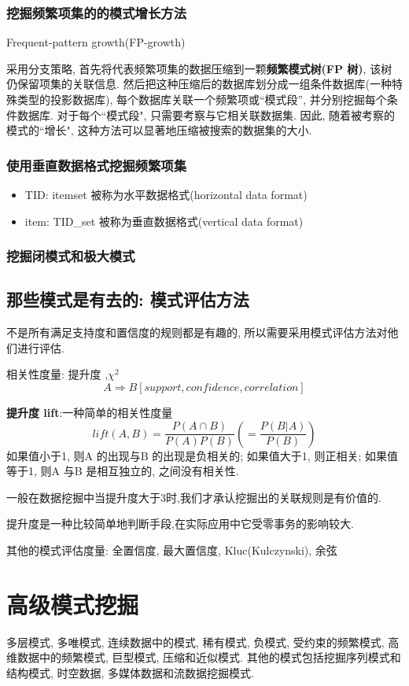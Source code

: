 \documentclass{article}
\begin{document}
\subsubsection{挖掘频繁项集的的模式增长方法}
Frequent-pattern growth(FP-growth)

采用分支策略, 首先将代表频繁项集的数据压缩到一颗\textbf{频繁模式树(FP 树)}, 该树仍保留项集的关联信息. 然后把这种压缩后的数据库划分成一组条件数据库(一种特殊类型的投影数据库), 每个数据库关联一个频繁项或``模式段'', 并分别挖掘每个条件数据库. 对于每个``模式段", 只需要考察与它相关联数据集. 因此, 随着被考察的模式的``增长", 这种方法可以显著地压缩被搜索的数据集的大小.

\subsubsection{使用垂直数据格式挖掘频繁项集}
\begin{itemize}
	\item TID: itemset 被称为水平数据格式(horizontal data format)
	\item item: TID\_set 被称为垂直数据格式(vertical data format)
\end{itemize}

\subsubsection{挖掘闭模式和极大模式}

\subsection{那些模式是有去的: 模式评估方法}
不是所有满足支持度和置信度的规则都是有趣的, 所以需要采用模式评估方法对他们进行评估.

相关性度量: 提升度 ,$\chi^2$\\
$$
A \Rightarrow B[support, confidence, correlation]
$$

\textbf{提升度 lift}:一种简单的相关性度量
$$
lift(A,B) = \frac{P(A \cap B)}{P(A)P(B)} ( = \frac{P(B|A)}{P(B)})
$$
如果值小于1, 则A 的出现与B 的出现是负相关的; 如果值大于1, 则正相关; 如果值等于1, 则A 与B 是相互独立的, 之间没有相关性.

一般在数据挖掘中当提升度大于3时,我们才承认挖掘出的关联规则是有价值的.

提升度是一种比较简单地判断手段,在实际应用中它受零事务的影响较大.

\bigskip
其他的模式评估度量: 全置信度, 最大置信度, Kluc(Kulczynski), 余弦

\section{高级模式挖掘}
多层模式, 多唯模式, 连续数据中的模式, 稀有模式, 负模式, 受约束的频繁模式, 高维数据中的频繁模式, 巨型模式, 压缩和近似模式.
其他的模式包括挖掘序列模式和结构模式, 时空数据, 多媒体数据和流数据挖掘模式.
\end{document}

